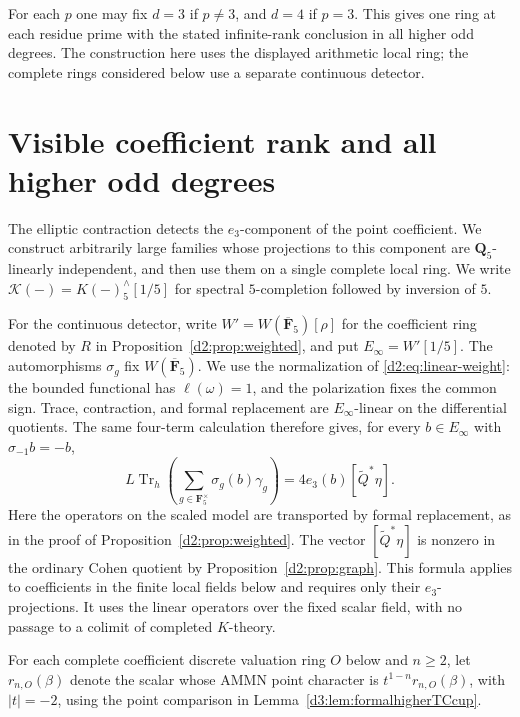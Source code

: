 \documentclass[11pt,a4paper]{amsart}
\numberwithin{equation}{section}
\theoremstyle{definition}
\theoremstyle{remark}
\begin{document}
For each $p$ one may fix $d=3$ if $p\ne3$, and $d=4$
if $p=3$. This gives one ring at each residue prime
with the stated infinite-rank conclusion in all higher odd
degrees. The construction here uses the displayed arithmetic local ring;
the complete rings considered below use a separate continuous detector.

\section{Visible coefficient rank and all higher odd degrees}
\label{d2ext:dimtwoVisibleHigherRank}

The elliptic contraction detects the $e_3$-component of the point
coefficient. We construct arbitrarily large families whose projections
to this component are $\mathbf Q_5$-linearly independent, and then use
them on a single complete local ring.
We write $\mathcal K(-)=K(-)^\wedge_5[1/5]$ for spectral
$5$-completion followed by inversion of $5$.

For the continuous detector, write $W'=W(\overline{\mathbf F}_5)[\rho]$
for the coefficient ring denoted by $R$ in
Proposition~\ref{d2:prop:weighted}, and put $E_\infty=W'[1/5]$.
The automorphisms $\sigma_g$ fix $W(\overline{\mathbf F}_5)$.
We use the normalization of \eqref{d2:eq:linear-weight}: the bounded
functional has $\ell(\omega)=1$, and the polarization fixes the common
sign. Trace, contraction, and formal replacement are $E_\infty$-linear
on the differential quotients. The same four-term calculation therefore
gives, for every $b\in E_\infty$ with $\sigma_{-1}b=-b$,
\[
 L\operatorname{Tr}_h\left(\sum_{g\in\mathbf F_5^\times}
                  \sigma_g(b)\gamma_g\right)
       =4e_3(b)[\widetilde Q^*\eta].
\]
Here the operators on the scaled model are transported by formal
replacement, as in the proof of Proposition~\ref{d2:prop:weighted}.
The vector $[\widetilde Q^*\eta]$ is nonzero in the ordinary Cohen
quotient by Proposition~\ref{d2:prop:graph}. This formula applies to
coefficients in the finite local fields below and requires only their
$e_3$-projections. It uses the linear operators over the fixed scalar
field, with no passage to a colimit of completed $K$-theory.

For each complete coefficient discrete valuation ring $O$ below and
$n\geq2$, let $r_{n,O}(\beta)$ denote the scalar whose AMMN point
character is $t^{1-n}r_{n,O}(\beta)$, with $|t|=-2$, using the point
comparison in Lemma~\ref{d3:lem:formalhigherTCcup}.
\end{document}
